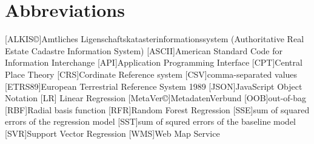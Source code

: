 \documentclass[a4paper, 11pt, oneside]{Thesis}  %
\begin{document}



\pagestyle{fancy}  %


\tableofcontents  %

\listoffigures  %

\listoftables  %

\clearpage  %
\chapter{Abbreviations}


\begin{acronym}
[ALKIS\copyright]{Amtliches Ligenschaftskatasterinformationssystem (Authoritative Real Estate Cadastre Information System)}
[ASCII]{American Standard Code for Information Interchange}
[API]{Application Programming Interface}
[CPT]{Central Place Theory}
[CRS]{Cordinate Reference system}
[CSV]{comma-separated values}
[ETRS89]{European Terrestrial Reference System 1989}
[JSON]{JavaScript Object Notation}
[LR] {Linear Regression}
[MetaVer\copyright]{MetadatenVerbund}
[OOB]{out-of-bag}
[RBF]{Radial basis function}
[RFR]{Random Forest Regression}
[SSE]{sum of squared errors of the regression model}
[SST]{sum of squred errors of the baseline model}
[SVR]{Support Vector Regression}
[WMS]{Web Map Service}

\end{acronym}
\end{document}
